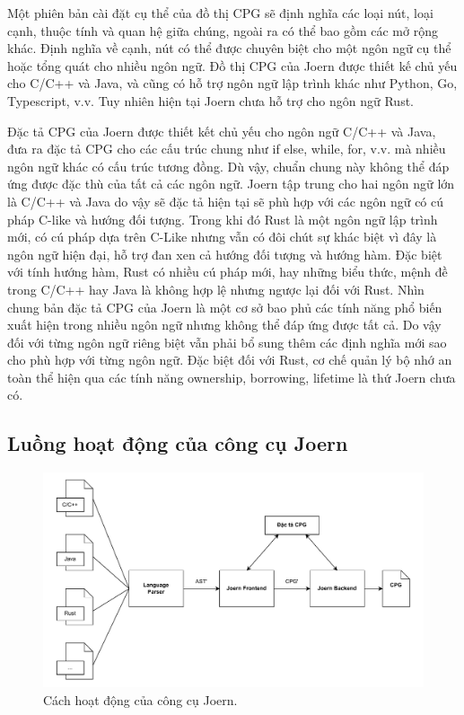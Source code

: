 Một phiên bản cài đặt cụ thể của đồ thị CPG sẽ định nghĩa các loại nút, loại cạnh, thuộc tính và quan hệ giữa chúng, ngoài ra có thể bao gồm các mở rộng khác.
Định nghĩa về cạnh, nút có thể được chuyên biệt cho một ngôn ngữ cụ thể hoặc tổng quát cho nhiều ngôn ngữ.
Đồ thị CPG của Joern được thiết kế chủ yếu cho C/C++ và Java, và cũng có hỗ trợ ngôn ngữ lập trình khác như Python, Go,  Typescript, v.v.
Tuy nhiên hiện tại Joern chưa hỗ trợ cho ngôn ngữ Rust.

Đặc tả CPG của Joern được thiết kết chủ yếu cho ngôn ngữ C/C++ và Java, đưa ra đặc tả CPG cho các cấu trúc chung như if else, while, for, v.v. mà nhiều ngôn ngữ khác có cấu trúc tương đồng.
Dù vậy, chuẩn chung này không thể đáp ứng được đặc thù của tất cả các ngôn ngữ.
Joern tập trung cho hai ngôn ngữ lớn là C/C++ và Java do vậy sẽ đặc tả hiện tại sẽ phù hợp với các ngôn ngữ có cú pháp C-like và hướng đối tượng.
Trong khi đó Rust là một ngôn ngữ lập trình mới, có cú pháp dựa trên C-Like nhưng vẫn có đôi chút sự khác biệt vì đây là ngôn ngữ hiện đại, hỗ trợ đan xen cả hướng đối tượng và hướng hàm.
Đặc biệt với tính hướng hàm, Rust có nhiều cú pháp mới, hay những biểu thức, mệnh đề trong C/C++ hay Java là không hợp lệ nhưng ngược lại đối với Rust.
Nhìn chung bản đặc tả CPG của Joern là một cơ sở bao phủ các tính năng phổ biến xuất hiện trong nhiều ngôn ngữ nhưng không thể đáp ứng được tất cả.
Do vậy đối với từng ngôn ngữ riêng biệt vẫn phải bổ sung thêm các định nghĩa mới sao cho phù hợp với từng ngôn ngữ.
Đặc biệt đối với Rust, cơ chế quản lý bộ nhớ an toàn thể hiện qua các tính năng ownership, borrowing, lifetime là thứ Joern chưa có.

\subsection{Luồng hoạt động của công cụ Joern}
\label{sec:joern_flow}

\begin{figure}[H]
  \includegraphics[width=1\columnwidth]{figures/c2/c2_frontend_backend.drawio.pdf}
  \centering
  \caption{Cách hoạt động của công cụ Joern.}
  \label{img:c2_frontend_backend}
\end{figure}

